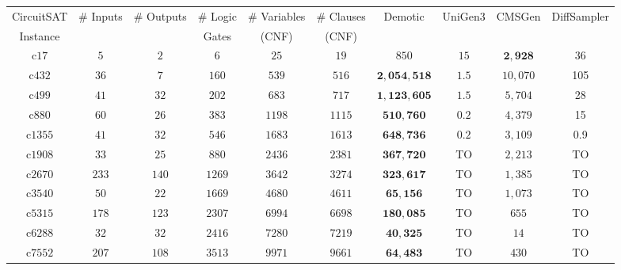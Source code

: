 \begin{tabular}{c|c|c|c|c|c|c|c|c|c} 
\hline
\midrule
CircuitSAT  & \multirow{ 2}{*}{\# Inputs} & \multirow{ 2}{*}{\# Outputs} & \# Logic & \# Variables & \# Clauses & \multirow{ 2}{*}{{\sc Demotic}} & \multirow{ 2}{*}{{\sc UniGen3}} & \multirow{ 2}{*}{{\sc CMSGen}} & \multirow{ 2}{*}{{\sc DiffSampler}}\\ 
Instance &  &  & Gates & (CNF) &  (CNF) & &  & &\\ 
 \midrule
c$17$    & $5$   & $2$   & $6$    & $25$   & $19$   & $850$       & $15$ & $\mathbf{2,928}$ & 36\\
c$432$   & $36$  & $7$   & $160$  & $539$  & $516$  & $\mathbf{2,054,518}$ & $1.5$ & $10,070$ & 105 \\
c$499$   & $41$  & $32$  & $202$  & $683$  & $717$  & $\mathbf{1,123,605}$ & $1.5$ & $5,704$ & 28\\
c$880$   & $60$  & $26$  & $383$  & $1198$ & $1115$ & $\mathbf{510,760}$   & $0.2$ & $4,379$ & 15\\
c$1355$  & $41$  & $32$  & $546$  & $1683$ & $1613$ & $\mathbf{648,736}$   & $0.2$ & $3,109$ & 0.9 \\
c$1908$  & $33$  & $25$  & $880$  & $2436$ & $2381$ & $\mathbf{367,720}$   & TO & $2,213$ & TO\\
c$2670$  & $233$ & $140$ & $1269$ & $3642$ & $3274$ & $\mathbf{323,617}$   & TO & $1,385$ & TO\\
c$3540$  & $50$  & $22$  & $1669$ & $4680$ & $4611$ & $\mathbf{65,156}$    & TO & $1,073$ & TO\\
c$5315$  & $178$ & $123$ & $2307$ & $6994$ & $6698$ & $\mathbf{180,085}$   & TO & $655$ & TO\\
c$6288$  & $32$  & $32$  & $2416$ & $7280$ & $7219$ & $\mathbf{40,325}$    & TO & $14$ & TO\\
c$7552$  & $207$ & $108$ & $3513$ & $9971$ & $9661$ & $\mathbf{64,483}$    & TO & $430$ & TO\\
\midrule
\hline
\end{tabular}


